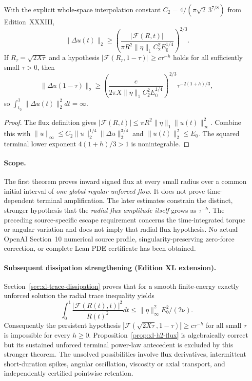 \begin{proposition}
\label{prop:xl-h2-flux}
With the explicit whole-space interpolation constant
$C_2=4/(\pi\sqrt2\,3^{7/8})$ from Edition~XXXIII,
\begin{equation}\label{eq:xl-h2}
\boxed{\quad
\|\Delta u(t)\|_2\ge
\left(
\frac{|\mathcal F(R,t)|}
{\pi R^2\|\eta\|_1C_2^2E_0^{1/4}}
\right)^{2/3}.\quad}
\end{equation}
If $R_\tau=\sqrt{2X\tau}$ and a hypothesis
$|\mathcal F(R_\tau,1-\tau)|\ge c\tau^{-h}$
holds for all sufficiently small $\tau>0$,
then
\[
\|\Delta u(1-\tau)\|_2\ge
\left(
\frac{c}{2\pi X\|\eta\|_1C_2^2E_0^{1/4}}
\right)^{2/3}\tau^{-2(1+h)/3},
\]
so $\int_{t_0}^1\|\Delta u(t)\|_2^2dt=\infty$.
\end{proposition}
\begin{proof}
The flux definition gives
$|\mathcal F(R,t)|\le
\pi R^2\|\eta\|_1\|u(t)\|_\infty^2$.
Combine this with
$\|u\|_\infty\le C_2\|u\|_2^{1/4}
\|\Delta u\|_2^{3/4}$ and $\|u(t)\|_2^2\le E_0$.
The squared terminal lower exponent
$4(1+h)/3>1$ is nonintegrable.
\end{proof}

\paragraph{Scope.}
The first theorem proves inward signed flux at every small
radius over a common initial interval of \emph{one global
regular unforced flow}. It does not prove time-dependent
terminal amplification. The later estimates constrain
the distinct, stronger hypothesis that the \emph{radial
flux amplitude itself} grows as $\tau^{-h}$.
The preceding source-specific escape requirement concerns
the time-integrated torque or angular variation and
does not imply that radial-flux hypothesis.
No actual OpenAI Section~10 numerical source
profile, singularity-preserving zero-force correction,
or complete Lean PDE certificate has been obtained.


\paragraph{Subsequent dissipation strengthening (Edition XL extension).}
Section~\ref{sec:xl-trace-dissipation} proves that for a
smooth finite-energy exactly unforced solution the radial trace
inequality yields
\[
\int_0^1\frac{|\mathcal F(R(t),t)|^2}{R(t)^2}dt
\le \|\eta\|_\infty^2 E_0^2/(2\nu).
\]
Consequently the persistent hypothesis
$|\mathcal F(\sqrt{2X\tau},1-\tau)|
\ge c\tau^{-h}$ for all small $\tau$ is impossible
for every $h\ge0$. Proposition~\ref{prop:xl-h2-flux}
is algebraically correct but its sustained unforced terminal
power-law antecedent is excluded by this stronger theorem.
The unsolved possibilities involve flux derivatives, intermittent
short-duration spikes, angular oscillation, viscosity or axial
transport, and independently certified pointwise retention.
